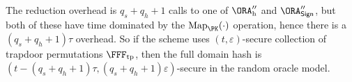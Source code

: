 \documentclass{crypto-exercise}
\newcommand{\FTP}{\FFF_{\mathrm{tp}}}
\newcommand{\ORAH}{\ORA_\text{h}}
\newcommand{\ORAS}{\ORA_\SIGN}
\begin{document}
\begin{solution}
The reduction overhead is $q_s + q_h + 1$ calls to one of $\ORAH''$ and $\ORAS''$, but both of these have time dominated by the $\MAP_\PK(\cdot)$ operation, hence there is a $(q_s + q_h + 1) \tau$ overhead.
So if the scheme uses  $(t,\varepsilon)$-secure collection of trapdoor permutations $\FTP$, then the full domain hash is $(t - (q_s + q_h + 1) \tau, (q_s + q_h + 1) \varepsilon)$-secure in the random oracle model.

\end{solution}
\end{document}
